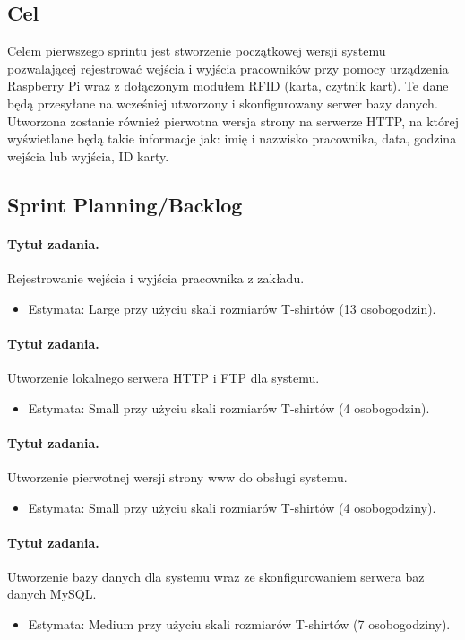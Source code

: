 \documentclass[a4paper]{article}
\begin{document}
\subsection{Cel} Celem pierwszego sprintu jest stworzenie początkowej wersji systemu pozwalającej rejestrować wejścia i wyjścia pracowników przy pomocy urządzenia Raspberry Pi wraz z dołączonym modułem RFID (karta, czytnik kart). Te dane będą przesyłane na wcześniej utworzony i skonfigurowany serwer bazy danych. Utworzona zostanie również pierwotna wersja strony na serwerze HTTP, na której wyświetlane będą takie informacje jak: imię i nazwisko pracownika, data, godzina wejścia lub wyjścia, ID karty.

\subsection{Sprint Planning/Backlog}

\paragraph{Tytuł zadania.} Rejestrowanie wejścia i wyjścia pracownika z zakładu.
\begin{itemize}
\item Estymata: Large przy użyciu skali rozmiarów T-shirtów (13 osobogodzin).
\end{itemize}

\paragraph{Tytuł zadania.} Utworzenie lokalnego serwera HTTP i FTP dla systemu.
\begin{itemize}
\item Estymata: Small przy użyciu skali rozmiarów T-shirtów (4 osobogodzin).
\end{itemize}

\paragraph{Tytuł zadania.} Utworzenie pierwotnej wersji strony www do obsługi systemu.
\begin{itemize}
\item Estymata: Small przy użyciu skali rozmiarów T-shirtów (4 osobogodziny).
\end{itemize}

\paragraph{Tytuł zadania.} Utworzenie bazy danych dla systemu wraz ze skonfigurowaniem serwera baz danych MySQL.
\begin{itemize}
\item Estymata: Medium przy użyciu skali rozmiarów T-shirtów (7 osobogodziny).
\end{itemize}
\end{document}
